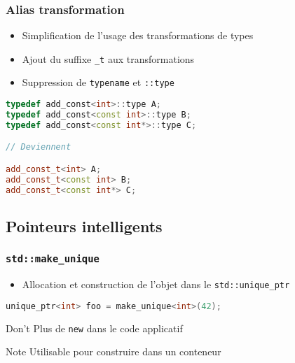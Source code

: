 \documentclass[C++.tex]{subfiles}
\begin{document}
\begin{frame}[fragile]
	\frametitle{Alias transformation}
	\begin{itemize}
		\item Simplification de l'usage des transformations de types
		\item Ajout du suffixe \lstinline|_t| aux transformations
		\item Suppression de \lstinline|typename| et \lstinline|::type|
	\end{itemize}

	\begin{lstlisting}[language=C++]
typedef add_const<int>::type A;
typedef add_const<const int>::type B;
typedef add_const<const int*>::type C;

// Deviennent

add_const_t<int> A;
add_const_t<const int> B;
add_const_t<const int*> C;\end{lstlisting}
\end{frame}

\subsection*{Pointeurs intelligents}
\begin{frame}[fragile]
	\frametitle{\lstinline|std::make_unique|}
	\begin{itemize}
		\item Allocation et construction de l'objet dans le \lstinline|std::unique_ptr|
	\end{itemize}

	\begin{lstlisting}[language=C++]
unique_ptr<int> foo = make_unique<int>(42);\end{lstlisting}

	\begin{alertblock}{Don't}
		Plus de \lstinline|new| dans le code applicatif
	\end{alertblock}

	\begin{block}{Note}
		Utilisable pour construire dans un conteneur
	\end{block}
\end{frame}
\end{document}
